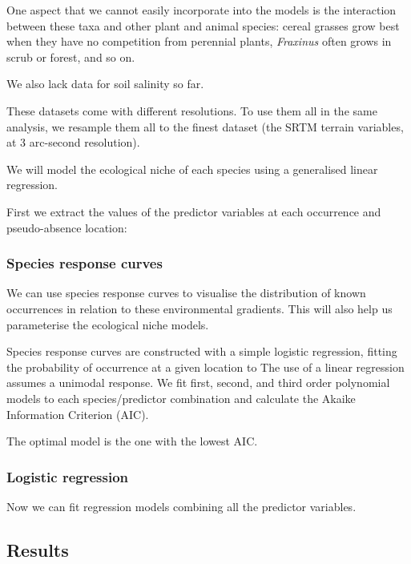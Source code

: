 \documentclass[]{article}
\begin{document}
One aspect that we cannot easily incorporate into the models is the
interaction between these taxa and other plant and animal species:
cereal grasses grow best when they have no competition from perennial
plants, \emph{Fraxinus} often grows in scrub or forest, and so on.

We also lack data for soil salinity so far.

These datasets come with different resolutions. To use them all in the
same analysis, we resample them all to the finest dataset (the SRTM
terrain variables, at 3 arc-second resolution).

We will model the ecological niche of each species using a generalised
linear regression.

First we extract the values of the predictor variables at each
occurrence and pseudo-absence location:

\hypertarget{species-response-curves}{%
\subsubsection{Species response curves}\label{species-response-curves}}

We can use species response curves to visualise the distribution of
known occurrences in relation to these environmental gradients. This
will also help us parameterise the ecological niche models.

Species response curves are constructed with a simple logistic
regression, fitting the probability of occurrence at a given location to
The use of a linear regression assumes a unimodal response. We fit
first, second, and third order polynomial models to each
species/predictor combination and calculate the Akaike Information
Criterion (AIC).

The optimal model is the one with the lowest AIC.

\hypertarget{logistic-regression}{%
\subsubsection{Logistic regression}\label{logistic-regression}}

Now we can fit regression models combining all the predictor variables.

\hypertarget{results}{%
\subsection{Results}\label{results}}
\end{document}
